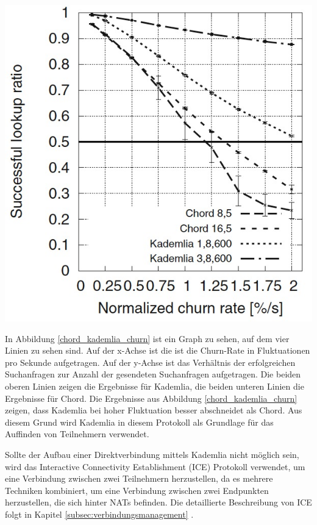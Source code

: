 \begin{center}
    \captionsetup{type=figure}
    \includegraphics[width=0.5\linewidth]{images/kademlia_chord_churn.jpg}
    \label{chord_kademlia_churn}
\end{center}

\noindent In Abbildung \ref{chord_kademlia_churn} ist ein Graph zu sehen, auf dem vier Linien zu sehen sind. Auf der x-Achse ist die ist die Churn-Rate in Fluktuationen pro Sekunde aufgetragen. Auf der y-Achse ist das Verhältnis der erfolgreichen Suchanfragen zur Anzahl der gesendeten Suchanfragen aufgetragen. Die beiden oberen Linien zeigen die Ergebnisse für Kademlia, die beiden unteren Linien die Ergebnisse für Chord. Die Ergebnisse aus Abbildung \ref{chord_kademlia_churn} zeigen, dass Kademlia bei hoher Fluktuation besser abschneidet als Chord. Aus diesem Grund wird Kademlia in diesem Protokoll als Grundlage für das Auffinden von Teilnehmern verwendet.


Sollte der Aufbau einer Direktverbindung mittels Kademlia nicht möglich sein, wird das Interactive Connectivity Establishment (ICE) Protokoll verwendet, um eine Verbindung zwischen zwei Teilnehmern herzustellen, da es mehrere Techniken kombiniert, um eine Verbindung zwischen zwei Endpunkten herzustellen, die sich hinter NATs befinden. Die detaillierte Beschreibung von ICE folgt in Kapitel \ref{subsec:verbindungsmanagement} \textit{}.


